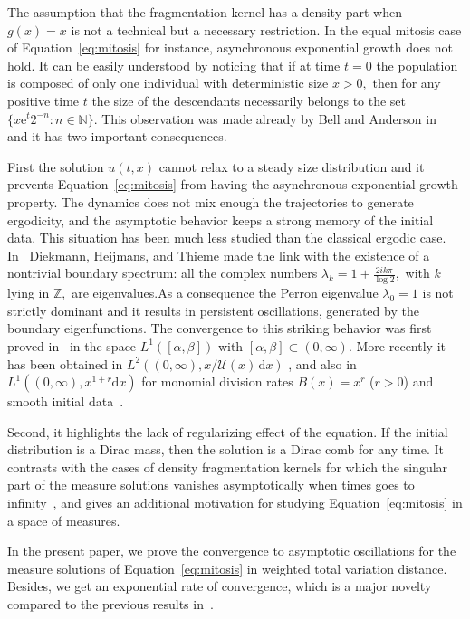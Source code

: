 \documentclass[10pt]{amsart}
\theoremstyle{definition}\newtheorem{defi}[theo]{Definition}\newtheorem{rema}[theo]{Remark}\newtheorem{exam}[theo]{Example}\newtheorem{exem}[theo]{Example}\newtheorem{nota}[theo]{Notation}
\newcommand{\Ucal}{\mathcal{U}}
\newcommand{\Z}{\mathbb{Z}}
\newcommand{\N}{\mathbb{N}}
\newcommand{\1}{\mathds{1}}
\newcommand{\e}{\mathrm{e}}
\renewcommand{\d}{\mathrm{d}}
\begin{document}
The assumption that the fragmentation kernel has a density part when $g(x)=x$ is not a technical but a necessary restriction. In the equal mitosis case of Equation~\eqref{eq:mitosis} for instance, asynchronous exponential growth does not hold. It can be easily understood by noticing that if at time $t=0$ the population is composed of only one individual with deterministic size $x>0,$ then for any positive time $t$ the size of the descendants necessarily belongs to the set $\{x\e^t2^{-n}: n\in\N\}$. This observation was made already by Bell and Anderson in~\cite{BellAnderson} and it has two important consequences.

First the solution $u(t,x)$ cannot relax to a steady size distribution and it prevents Equation~\eqref{eq:mitosis} from having the asynchronous exponential growth property. The dynamics does not mix enough the trajectories to generate ergodicity, and the asymptotic behavior keeps a strong memory of the initial data. This situation has been much less studied than the classical ergodic case. In~\cite{Diekmann1984,Heijmans1985} Diekmann, Heijmans, and Thieme made the link with the existence of a nontrivial boundary spectrum: all the complex numbers $\lambda_k=1+\frac{2ik\pi}{\log2},$ with $k$ lying in $\Z,$ are eigenvalues.\linebreak As a consequence the Perron eigenvalue $\lambda_0=1$ is not strictly dominant and it results in persistent oscillations, generated by the boundary eigenfunctions. The convergence to this striking behavior was first proved in~\cite{GreinerNagel} in the space $L^1([\alpha,\beta])$ with $[\alpha,\beta]\subset(0,\infty).$ More recently it has been obtained in $L^2((0,\infty),x/\Ucal(x)\,\d x)$ \cite{BDG}, and also in $L^1((0,\infty),x^{1+r}\d x)$ for monomial division rates $B(x)=x^r$ ($r>0$) and smooth initial data~\cite{vanBrunt2018}.

Second, it highlights the lack of regularizing effect of the equation. If the initial distribution is a Dirac mass, then the solution is a Dirac comb for any time. It contrasts with the cases of density fragmentation kernels for which the singular part of the measure solutions vanishes asymptotically when times goes to infinity~\cite{Debiec2018}, and gives an additional motivation for studying Equation~\eqref{eq:mitosis} in a space of measures.

In the present paper, we prove the convergence to asymptotic oscillations for the measure solutions of Equation~\eqref{eq:mitosis} in weighted total variation distance. Besides, we get an exponential rate of convergence, which is a major novelty compared to the previous results in~\cite{vanBrunt2018,BDG,GreinerNagel}.
\end{document}
